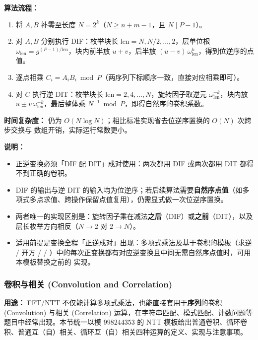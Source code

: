 \textbf{算法流程：}
\begin{enumerate}
    \item 将 $A,B$ 补零至长度 $N=2^k$（$N\ge n+m-1$，且 $N\mid P-1$）。
    \item 对 $A,B$ 分别执行 DIF：枚举块长 $\text{len}=N,N/2,\dots,2$，层单位根 $\omega_{\text{len}}=g^{(P-1)/\text{len}}$，块内前半放 $u+v$，后半放 $(u-v)\,\omega_{\text{len}}^{k}$，得到位逆序的点值。
    \item 逐点相乘 $C_i=A_iB_i\bmod P$（两序列下标顺序一致，直接对应相乘即可）。
    \item 对 $C$ 执行逆 DIT：枚举块长 $\text{len}=2,4,\dots,N$，旋转因子取逆元 $\omega_{\text{len}}^{-k}$，块内放 $u\pm v\,\omega_{\text{len}}^{-k}$，最后整体乘 $N^{-1}\bmod P$，即得自然序的卷积系数。
\end{enumerate}

\textbf{时间复杂度：} 仍为 $O(N\log N)$；相比标准实现省去位逆序置换的 $O(N)$ 次跨步交换与  数组开销，实际运行常数更小。



\textbf{说明：}
\begin{itemize}
    \item 正逆变换必须「DIF 配 DIT」成对使用：两次都用 DIF 或两次都用 DIT 都得不到正确的卷积。
    \item DIF 的输出与逆 DIT 的输入均为位逆序；若后续算法需要\textbf{自然序点值}（如多项式多点求值、跨操作保留点值复用），仍需显式做一次位逆序置换。
    \item 两者唯一的实现区别是：旋转因子乘在减法\textbf{之后}（DIF）或\textbf{之前}（DIT），以及层长枚举方向相反（$N\to2$ 对 $2\to N$）。
    \item 适用前提是变换全程「正逆成对」出现：多项式乘法及基于卷积的模板（求逆 / 开方 /  / ）中的每次正变换都有对应逆变换且中间无需自然序点值时，可用本模板替换之前的  实现。
\end{itemize}

\subsubsection{卷积与相关 (Convolution and Correlation)}

\textbf{用途：}
FFT/NTT 不仅能计算多项式乘法，也能直接套用于\textbf{序列}的卷积 (Convolution) 与相关 (Correlation) 运算，在字符串匹配、模式匹配、计数问题等题目中经常出现。本节统一以模 $998244353$ 的 NTT 模板给出普通卷积、循环卷积、普通互（自）相关、循环互（自）相关四种运算的定义、实现与注意事项。

